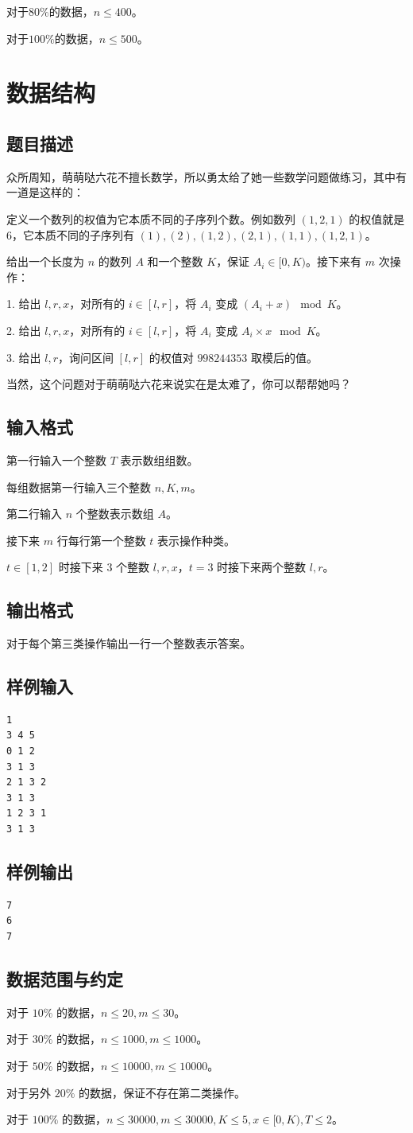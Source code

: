 \documentclass[11pt, a4paper]{article}
\begin{document}
对于$80\%$的数据，$n \leq 400$。

对于$100\%$的数据，$n \leq 500$。
\newpage
\section{数据结构}

\subsection{题目描述}
众所周知，萌萌哒六花不擅长数学，所以勇太给了她一些数学问题做练习，其中有一道是这样的：

定义一个数列的权值为它本质不同的子序列个数。例如数列 $(1,2,1)$ 的权值就是 $6$，它本质不同的子序列有 $(1),(2),(1,2),(2,1),(1,1),(1,2,1)$。 

给出一个长度为 $n$ 的数列 $A$ 和一个整数 $K$，保证 $A_i \in [0,K)$。接下来有 $m$ 次操作：

1. 给出 $l,r,x$，对所有的 $i \in [l,r]$，将 $A_i$ 变成 $(A_i+x) \mod K$。

2. 给出 $l,r,x$，对所有的 $i \in [l,r]$，将 $A_i$ 变成 $A_i \times x \mod K$。

3. 给出 $l,r$，询问区间 $[l,r]$ 的权值对 $998244353$ 取模后的值。
 
当然，这个问题对于萌萌哒六花来说实在是太难了，你可以帮帮她吗？
\subsection{输入格式}
第一行输入一个整数 $T$ 表示数组组数。

每组数据第一行输入三个整数 $n,K,m$。

第二行输入 $n$ 个整数表示数组 $A$。

接下来 $m$ 行每行第一个整数 $t$ 表示操作种类。

$t \in [1,2]$ 时接下来 $3$ 个整数 $l,r,x$，$t=3$ 时接下来两个整数 $l,r$。

\subsection{输出格式}
对于每个第三类操作输出一行一个整数表示答案。

\subsection{样例输入}
\begin{verbatim}
1
3 4 5
0 1 2
3 1 3
2 1 3 2
3 1 3
1 2 3 1
3 1 3
\end{verbatim}
\subsection{样例输出}
\begin{verbatim}
7
6
7
\end{verbatim}

\subsection{数据范围与约定}
对于 $10\%$ 的数据，$n \leq 20,m \leq 30$。

对于 $30\%$ 的数据，$n \leq 1000,m \leq 1000$。

对于 $50\%$ 的数据，$n \leq 10000,m \leq 10000$。

对于另外 $20\%$ 的数据，保证不存在第二类操作。

对于 $100\%$ 的数据，$n \leq 30000,m \leq 30000,K \leq 5, x\in [0,K),T \leq 2$。
\end{document}
